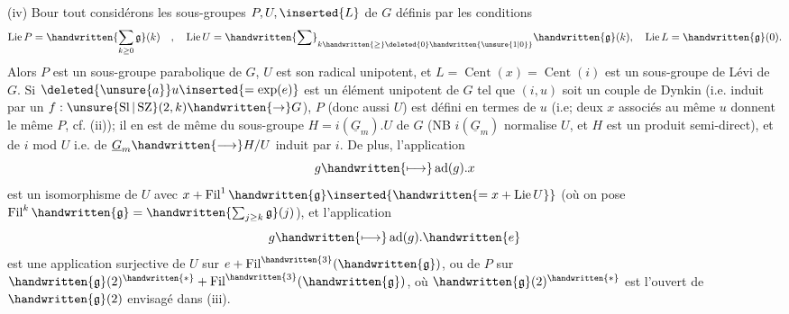 (iv) Bour tout  considérons les sous-groupes $P,U,\inserted{L}$ de $G$ définis par les conditions
\[
\operatorname{Lie}P=\handwritten{\sum_{k\geq0}\mathfrak{g}}(k)\quad,\quad
\operatorname{Lie}U=\handwritten{\sum}_{k\handwritten{\geq}\deleted{0}\handwritten{\unsure{1|0}}}\handwritten{\mathfrak{g}}(k),\quad
\operatorname{Lie}L=\handwritten{\mathfrak{g}}(0).
\]
Alors $P$ est un sous-groupe parabolique de $G$, $U$ est son radical unipotent, et $L=\operatorname{Cent}(x)=\operatorname{Cent}(i)$  est un sous-groupe de Lévi de $G$. Si $\deleted{\unsure{a}}u\inserted{=\exp(e)}$ est un élément unipotent de $G$ tel que $(i,u)$ soit un couple de Dynkin (i.e. induit par un $f:\unsure{\operatorname{Sl}|\operatorname{SZ}}(2,k)\handwritten{\to}G$), $P$ (donc aussi $U$) est défini en termes de $u$ (i.e; deux $x$ associés au même $u$ donnent le même $P$, cf. (ii)); il en est de même du sous-groupe $H=i(\underline{G}_m).U$ de $G$ (NB $i(\underline{G}_m)$ normalise $U$, et $H$ est un produit semi-direct), et de $i$ mod $U$ i.e. de $\underline{G}_m\handwritten{\longrightarrow}H/U$ induit par $i$. De plus, l'application
\[
g\handwritten{\longmapsto}\operatorname{ad}(g).x
\]
est un isomorphisme de $U$ avec $x+\operatorname{Fil}^{1}\handwritten{\mathfrak{g}}\inserted{\handwritten{=x+\operatorname{Lie}U}}$ (où on pose $\operatorname{Fil}^{k}\handwritten{\mathfrak{g}}=\handwritten{\sum_{j\geq k}\mathfrak{g}}(j)$), et l'application
\[
g\handwritten{\longmapsto}\operatorname{ad}(g).\handwritten{e}
\]
est une application surjective de $U$ sur $e+\operatorname{Fil}^{\handwritten{3}}(\handwritten{\mathfrak{g}})$, ou de $P$ sur $\handwritten{\mathfrak{g}}(2)^{\handwritten{*}}+\operatorname{Fil}^{\handwritten{3}}(\handwritten{\mathfrak{g}})$, où $\handwritten{\mathfrak{g}}(2)^{\handwritten{*}}$ est l'ouvert de $\handwritten{\mathfrak{g}}(2)$ envisagé dans (iii).
